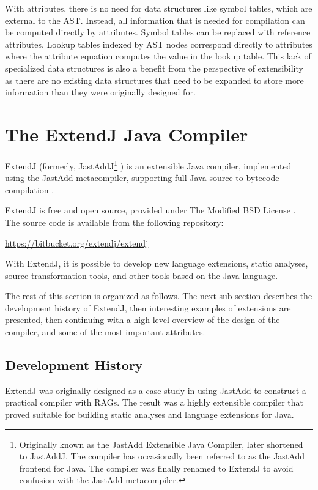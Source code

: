 \documentclass[10pt, twoside, openright]{book}
\begin{document}
With attributes, there is no need for data structures like symbol tables, which are external to the
AST. Instead, all information that is needed for compilation can be computed directly by attributes.
Symbol tables can be replaced with reference attributes. Lookup tables indexed by AST nodes
correspond directly to attributes where the attribute equation computes the value in the lookup
table. This lack of specialized data structures is also a benefit from the perspective of
extensibility as there are no existing data structures that need to be expanded to store more
information than they were originally designed for.


\section{The ExtendJ Java Compiler}
\label{sec:extendj}

ExtendJ (formerly, JastAddJ\footnote{Originally known as
the JastAdd Extensible Java Compiler, later shortened to JastAddJ. The compiler
has occasionally been referred to as the JastAdd frontend for Java.
The compiler was finally renamed to ExtendJ to avoid confusion with the JastAdd metacompiler.}
\cite{jastaddj})
is an extensible Java compiler, implemented using the JastAdd metacompiler, supporting full
Java source-to-bytecode compilation \cite{extendjorg}.

ExtendJ is free and open source, provided under The Modified BSD License \cite{bsd3clause}. The source
code is available from the following repository:

\begin{center}
\url{https://bitbucket.org/extendj/extendj}
\end{center}

With ExtendJ, it is possible to develop new language extensions,
static analyses, source transformation tools, and other tools based on the Java language.

The rest of this section is organized as follows.
The next sub-section describes the development
history of ExtendJ, then interesting examples of extensions are presented, then continuing with
a high-level overview of the design of the compiler, and some of the most important attributes.

\subsection{Development History}

ExtendJ was originally designed as a case study in using JastAdd
to construct a practical compiler with RAGs.
The result was a highly extensible compiler that proved suitable for building static analyses
and language extensions for Java.
\end{document}
